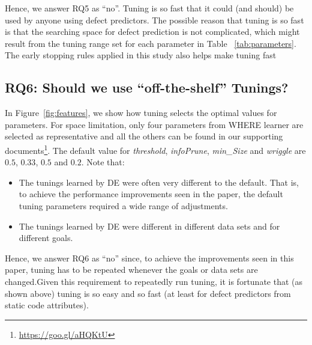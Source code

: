 \documentclass{sig-alternative}
\newcommand{\bi}{\begin{itemize}[leftmargin=0.4cm]}
\newcommand{\ei}{\end{itemize}}
\newcommand{\fig}[1]{Figure~\ref{fig:#1}}
\newcommand{\tab}[1]{Table ~\ref{tab:#1}}
\begin{document}
Hence, we answer RQ5 as ``no''. Tuning is so fast that
it could (and should) be used by anyone using defect predictors. The possible reason that tuning is so fast is that the searching space for defect prediction is not complicated, which might result from the tuning range set for each parameter in \tab{parameters}. The early stopping rules applied in this study also helps make tuning fast

\subsection{RQ6: Should we use ``off-the-shelf'' Tunings?}\label{sect:variance}
 
 In \fig{features}, we show how tuning selects the optimal values for parameters. For space limitation, only four parameters from WHERE learner are selected as representative and all the others can be found in our supporting documents\footnote{\url{https://goo.gl/aHQKtU}}.
The default value for {\em threshold}, {\em infoPrune}, {\em min\_Size} and {\em wriggle} are $0.5$, $0.33$, $0.5$ and $0.2$. Note that:
\bi
\item
The tunings learned by DE
were often very different to the default. That is, to achieve the performance improvements seen in the paper,
the default tuning parameters required a wide range of adjustments.
\item The tunings learned by DE were different in different data sets and for different goals.
\ei
Hence, we answer RQ6 as ``no'' since, to achieve the improvements seen in this paper, tuning has to be repeated whenever the goals or data
sets are changed.Given this requirement to repeatedly run tuning, it is fortunate that (as shown above)
tuning is so easy and so fast (at least for defect predictors from static code attributes). %
 
\end{document}
